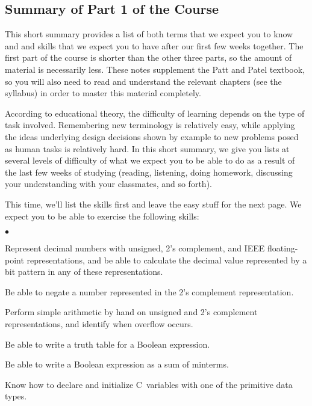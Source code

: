 \classtitle

\subsection{Summary of Part 1 of the Course}

This short summary provides a list of both terms that we expect you to
know and and skills that we expect you to have after our first few weeks
together.  The first part of the course is shorter than the other three
parts, so the amount of material is necessarily less.
%
These notes supplement the Patt and Patel textbook, so you will also 
need to read and understand the relevant chapters (see the syllabus)
in order to master this material completely.

According to educational theory, the difficulty of learning depends on 
the type of task involved.  Remembering new terminology is relatively 
easy, while applying the ideas underlying design decisions shown by 
example to new problems posed as human tasks is relatively hard.
%
In this short summary, we give you lists at several levels of difficulty
of what we expect you to be able to do as a result of the last few weeks
of studying (reading, listening, doing homework, discussing your
understanding with your classmates, and so forth).

This time, we'll list the skills first and leave the easy stuff for the 
next page.
%
We expect you to be able to exercise the following skills:

\begin{list}{$\bullet$}{\setlength{\itemsep}{0pt}\setlength{\parskip}{0pt}%
\setlength{\topsep}{0pt}\setlength{\partopsep}{0pt}\setlength{\parsep}{0pt}}

\item{Represent decimal numbers with unsigned, 2's complement, and IEEE
floating-point representations, and be able to calculate the decimal value
represented by a bit pattern in any of these representations.}

\item{Be able to negate a number represented in the 2's complement
representation.}

\item{Perform simple arithmetic by hand on unsigned and 2's complement
representations, and identify when overflow occurs.}

\item{Be able to write a truth table for a Boolean expression.}

\item{Be able to write a Boolean expression as a sum of minterms.}

%
% 

\item{Know how to declare and initialize C~variables with one of the 
primitive data types.}

\end{list}

